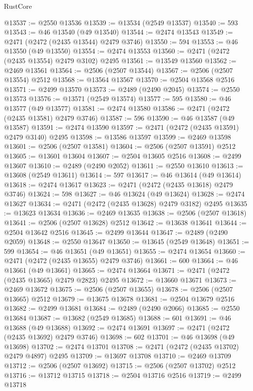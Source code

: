 \begin{lexlean}{RustCore}
\begin{coremodule}
@13537 := @2550 @13536
@13539 := @13534 (@2549 @13537)
@13540 := 593
@13543 := @46 @13540 (@49 @13540)
@13544 := @2474 @13543
@13549 := @2471 (@2472 (@2435 @13544) @2479 @3746)
@13550 := 594
@13553 := @46 @13550 (@49 @13550)
@13554 := @2474 @13553
@13560 := @2471 (@2472 (@2435 @13554) @2479 @3102) @2495
@13561 := @13549 @13560
@13562 := @2469 @13561
@13564 := @2506 (@2507 @13544)
@13567 := @2506 (@2507 @13554) @2512
@13568 := @13564 @13567
@13570 := @2504 @13568 @2516
@13571 := @2499 @13570
@13573 := @2489 (@2490 @2045)
@13574 := @2550 @13573
@13576 := @13571 (@2549 @13574)
@13577 := 595
@13580 := @46 @13577 (@49 @13577)
@13581 := @2474 @13580
@13586 := @2471 (@2472 (@2435 @13581) @2479 @3746)
@13587 := 596
@13590 := @46 @13587 (@49 @13587)
@13591 := @2474 @13590
@13597 := @2471 (@2472 (@2435 @13591) @2479 @3140) @2495
@13598 := @13586 @13597
@13599 := @2469 @13598
@13601 := @2506 (@2507 @13581)
@13604 := @2506 (@2507 @13591) @2512
@13605 := @13601 @13604
@13607 := @2504 @13605 @2516
@13608 := @2499 @13607
@13610 := @2489 (@2490 @2052)
@13611 := @2550 @13610
@13613 := @13608 (@2549 @13611)
@13614 := 597
@13617 := @46 @13614 (@49 @13614)
@13618 := @2474 @13617
@13623 := @2471 (@2472 (@2435 @13618) @2479 @3746)
@13624 := 598
@13627 := @46 @13624 (@49 @13624)
@13628 := @2474 @13627
@13634 := @2471 (@2472 (@2435 @13628) @2479 @3182) @2495
@13635 := @13623 @13634
@13636 := @2469 @13635
@13638 := @2506 (@2507 @13618)
@13641 := @2506 (@2507 @13628) @2512
@13642 := @13638 @13641
@13644 := @2504 @13642 @2516
@13645 := @2499 @13644
@13647 := @2489 (@2490 @2059)
@13648 := @2550 @13647
@13650 := @13645 (@2549 @13648)
@13651 := 599
@13654 := @46 @13651 (@49 @13651)
@13655 := @2474 @13654
@13660 := @2471 (@2472 (@2435 @13655) @2479 @3746)
@13661 := 600
@13664 := @46 @13661 (@49 @13661)
@13665 := @2474 @13664
@13671 := @2471 (@2472 (@2435 @13665) @2479 @2823) @2495
@13672 := @13660 @13671
@13673 := @2469 @13672
@13675 := @2506 (@2507 @13655)
@13678 := @2506 (@2507 @13665) @2512
@13679 := @13675 @13678
@13681 := @2504 @13679 @2516
@13682 := @2499 @13681
@13684 := @2489 (@2490 @2066)
@13685 := @2550 @13684
@13687 := @13682 (@2549 @13685)
@13688 := 601
@13691 := @46 @13688 (@49 @13688)
@13692 := @2474 @13691
@13697 := @2471 (@2472 (@2435 @13692) @2479 @3746)
@13698 := 602
@13701 := @46 @13698 (@49 @13698)
@13702 := @2474 @13701
@13708 := @2471 (@2472 (@2435 @13702) @2479 @4897) @2495
@13709 := @13697 @13708
@13710 := @2469 @13709
@13712 := @2506 (@2507 @13692)
@13715 := @2506 (@2507 @13702) @2512
@13716 := @13712 @13715
@13718 := @2504 @13716 @2516
@13719 := @2499 @13718

\end{coremodule}
\end{lexlean}
